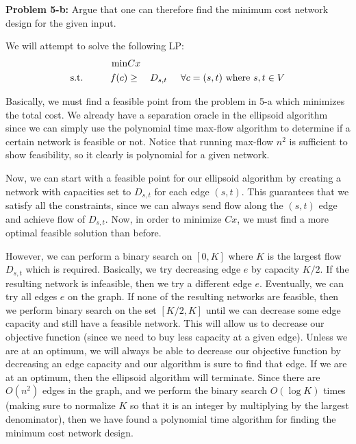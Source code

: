\documentclass[psamsfonts]{amsart}
\newenvironment{sol}{\vspace{0.25cm}{\large \bfseries Solution:}}{\qedsymbol}
\newenvironment{prob}[1]{\begin{framed}{\large \bfseries Problem #1:}}{\end{framed}}
\begin{document}
\begin{prob}{5-b}
Argue that one can therefore find the minimum cost network design for the given input. 
\end{prob}
\begin{sol}
We will attempt to solve the following LP:
\begin{eqnarray}
\min &Cx& \\
\text{s.t.} \hspace{1cm} f(c) &\geq& D_{s,t} \hspace{0.5cm} \forall c=(s,t) \text{ where } s,t \in V
\end{eqnarray}

Basically, we must find a feasible point from the problem in 5-a which minimizes the total cost. We already have a separation oracle in the ellipsoid algorithm since we can simply use the polynomial time max-flow algorithm to determine if a certain network is feasible or not. Notice that running max-flow $n^2$ is sufficient to show feasibility, so it clearly is polynomial for a given network. 

Now, we can start with a feasible point for our ellipsoid algorithm by creating a network with capacities set to $D_{s,t}$ for each edge $(s,t)$. This guarantees that we satisfy all the constraints, since we can always send flow along the $(s,t)$ edge and achieve flow of $D_{s,t}$. Now, in order to minimize $Cx$, we must find a more optimal feasible solution than before. 

However, we can perform a binary search on $[0,K]$ where $K$ is the largest flow $D_{s,t}$ which is required. Basically, we try decreasing edge $e$ by capacity $K/2$. If the resulting network is infeasible, then we try a different edge $e$. Eventually, we can try all edges $e$ on the graph. If none of the resulting networks are feasible, then we perform binary search on the set $[K/2, K]$ until we can decrease some edge capacity and still have a feasible network. This will allow us to decrease our objective function (since we need to buy less capacity at a given edge). Unless we are at an optimum, we will always be able to decrease our objective function by decreasing an edge capacity and our algorithm is sure to find that edge. If we are at an optimum, then the ellipsoid algorithm will terminate. Since there are $O(n^2)$ edges in the graph, and we perform the binary search $O(\log K)$ times (making sure to normalize $K$ so that it is an integer by multiplying by the largest denominator), then we have found a polynomial time algorithm for finding the minimum cost network design.
\end{sol}
\end{document}
